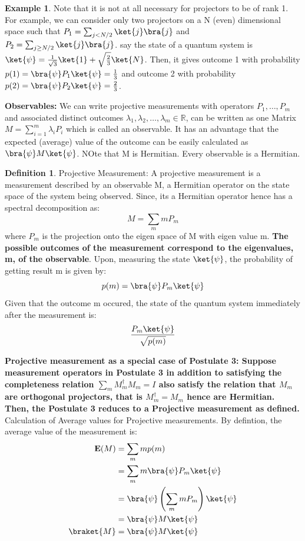 \documentclass[12pt, oneside]{book}
\theoremstyle{definition}
\newtheorem{definition}{Definition}[section]
\theoremstyle{definition}
\newtheorem{example}{Example}[section]
\theoremstyle{remark}
\begin{document}
\begin{example}
    Note that it is not at all necessary for projectors to be of rank 1. For example, we can consider only two projectors on a 
    N (even) dimensional space such that $P_1=\sum_{j<N/2} \ket{j}\bra{j}$ and $P_2=\sum_{j\geq N/2} \ket{j}\bra{j}$. say the state
    of a quantum system is $\ket{\psi}=\frac{1}{\sqrt{3}}\ket{1}+\sqrt{\frac{2}{3}}\ket{N}$. Then,
    it gives outcome 1 with probability $p(1)=\bra{\psi}P_1\ket{\psi}=\frac{1}{3}$ and outcome 2 with probability $p(2)=\bra{\psi}P_2\ket{\psi} = \frac{2}{3}$.

\end{example}

\textbf{Observables: }We can write projective measurements with operators $P_1,\ldots,P_m$ and associated 
distinct outcomes $\lambda_1,\lambda_2,\ldots,\lambda_m \in \mathbb{R}$, can be written as one Matrix $M=\sum_{i=1}^m \lambda_iP_i$ which
is called an observable. It has an advantage that the expected (average) value of the outcome can be easily calculated as $\bra{\psi}M\ket{\psi}$.
NOte that M is Hermitian. Every observable is a Hermitian.

\begin{definition}
    Projective Measurement: A projective measurement is a measurement described by an observable M, a Hermitian operator on the state space of the system
    being observed. Since, its a Hermitian operator hence has a spectral decomposition as:
    \[M=\sum_m mP_m\]
    where $P_m$ is the projection onto the eigen space of M with eigen value m. 
    \textbf{The possible outcomes of the measurement correspond to the eigenvalues, m, of the observable}. Upon,
    measuring the state $\ket{\psi}$, the probability of getting result m is given by:
    \[p(m)=\bra{\psi}P_m\ket{\psi}\]
    Given that the outcome m occured, the state of the quantum system immediately after the measurement is:
    \[\dfrac{P_m\ket{\psi}}{\sqrt{p(m)}}\]
\end{definition}

\textbf{Projective measurement as a special case of Postulate 3: Suppose measurement operators in Postulate 3 in addition to satisfying the 
completeness relation $\sum_m M_m^{\dagger}M_m=I$ also satisfy the relation that $M_m$ are orthogonal projectors, that is $M_m^{\dagger}=M_m$
hence are Hermitian. Then, the Postulate 3 reduces to a Projective measurement as defined.}
Calculation of Average values for Projective measurements. By defintion, the average value of the measurement is:
\begin{align*}
    \mathbf{E}(M) &= \sum_m m p(m) \\
    &= \sum_m m \bra{\psi}P_m\ket{\psi} \\
    &= \bra{\psi}\left(\sum_m mP_m\right)\ket{\psi} \\
    &= \bra{\psi}M\ket{\psi}\\
    \braket{M}&=\bra{\psi}M\ket{\psi}
\end{align*}
\end{document}
